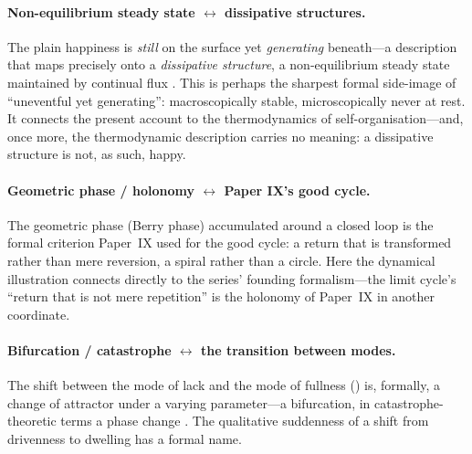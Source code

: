 \paragraph{Non-equilibrium steady state $\leftrightarrow$ dissipative structures.} The plain happiness is \emph{still} on the surface yet \emph{generating} beneath---a description that maps precisely onto a \emph{dissipative structure}, a non-equilibrium steady state maintained by continual flux \parencite{prigogine1984}. This is perhaps the sharpest formal side-image of ``uneventful yet generating'': macroscopically stable, microscopically never at rest. It connects the present account to the thermodynamics of self-organisation---and, once more, the thermodynamic description carries no meaning: a dissipative structure is not, as such, happy.

\paragraph{Geometric phase / holonomy $\leftrightarrow$ Paper IX's good cycle.} The geometric phase (Berry phase) accumulated around a closed loop \parencite{berry1984} is the formal criterion Paper~IX \parencite{paperix} used for the good cycle: a return that is transformed rather than mere reversion, a spiral rather than a circle. Here the dynamical illustration connects directly to the series' founding formalism---the limit cycle's ``return that is not mere repetition'' is the holonomy of Paper~IX in another coordinate.

\paragraph{Bifurcation / catastrophe $\leftrightarrow$ the transition between modes.} The shift between the mode of lack and the mode of fullness () is, formally, a change of attractor under a varying parameter---a bifurcation, in catastrophe-theoretic terms a phase change \parencite{thom1975,haken1983}. The qualitative suddenness of a shift from drivenness to dwelling has a formal name.

